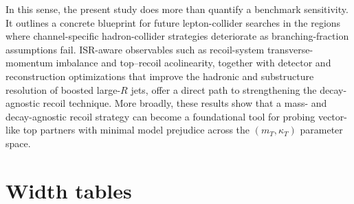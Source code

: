 \documentclass[a4paper,11pt]{article}
\begin{document}
In this sense, the present study does more than quantify a benchmark sensitivity. It outlines a concrete blueprint for future lepton-collider searches in the regions where channel-specific hadron-collider strategies deteriorate as branching-fraction assumptions fail. ISR-aware observables such as recoil-system transverse-momentum imbalance and top--recoil acolinearity, together with detector and reconstruction optimizations that improve the hadronic and substructure resolution of boosted large-$R$ jets, offer a direct path to strengthening the decay-agnostic recoil technique. More broadly, these results show that a mass- and decay-agnostic recoil strategy can become a foundational tool for probing vector-like top partners with minimal model prejudice across the $(m_T,\kappa_T)$ parameter space.


\appendix
\section{Width tables}\label{app:widths}




\end{document}
